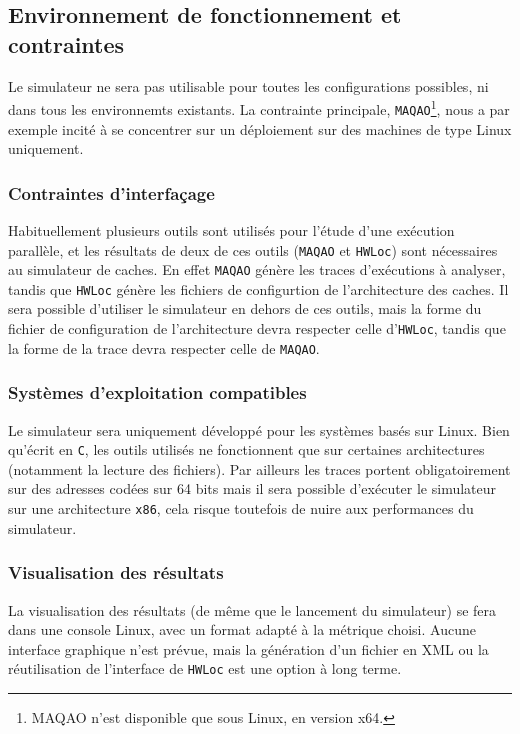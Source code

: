 \subsection{Environnement de fonctionnement et contraintes}

Le simulateur ne sera pas utilisable pour toutes les configurations possibles, ni dans tous les environnemts existants. La contrainte principale, \texttt{MAQAO}\footnote{MAQAO n'est disponible que sous Linux, en version x64.}, nous a par exemple incité à se concentrer sur un déploiement sur des machines de type Linux uniquement. 

\subsubsection{Contraintes d'interfaçage}

Habituellement plusieurs outils sont utilisés pour l'étude d'une exécution parallèle, et les résultats de deux de ces outils (\texttt{MAQAO} et \texttt{HWLoc}) sont nécessaires au simulateur de caches. En effet \texttt{MAQAO} génère les traces d'exécutions à analyser, tandis que \texttt{HWLoc}
génère les fichiers de configurtion de l'architecture des caches. Il sera possible d'utiliser le simulateur en dehors de ces outils, mais la forme du fichier de configuration de l'architecture devra respecter celle d'\texttt{HWLoc}, tandis que la forme de la trace devra respecter celle de \texttt{MAQAO}.

\subsubsection{Systèmes d'exploitation compatibles}

Le simulateur sera uniquement développé pour les systèmes basés sur Linux. Bien qu'écrit en \texttt{C}, les outils utilisés ne fonctionnent que sur certaines architectures (notamment la lecture des fichiers). Par ailleurs les traces portent obligatoirement sur des adresses codées sur 64 bits mais il sera possible d'exécuter le simulateur sur une architecture \verb!x86!, cela risque toutefois de nuire aux performances du simulateur.

\subsubsection{Visualisation des résultats}

La visualisation des résultats (de même que le lancement du simulateur) se fera dans une console Linux, avec un format adapté à la métrique choisi. Aucune interface graphique n'est prévue, mais la génération d'un fichier en XML ou la réutilisation de l'interface de \texttt{HWLoc} est une option à long terme.
